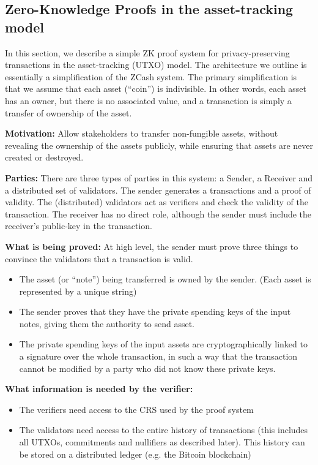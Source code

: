 \subsection{Zero-Knowledge Proofs in the asset-tracking model}

In this section, we describe a simple ZK proof system for privacy-preserving transactions in the asset-tracking (UTXO) model.  The architecture we outline is essentially a simplification of the ZCash system.  The primary simplification is that we assume that each asset (“coin”) is indivisible.  In other words, each asset has an owner, but there is no associated value, and a transaction is simply a transfer of ownership of the asset.

\textbf{Motivation:} Allow stakeholders to transfer non-fungible assets, without revealing the ownership of the assets publicly, while ensuring that assets are never created or destroyed.

\textbf{Parties:} There are three types of parties in this system: a Sender, a Receiver and a distributed set of validators.  The sender generates a transactions and a proof of validity.  The (distributed) validators act as verifiers and check the validity of the transaction.  The receiver has no direct role, although the sender must include the receiver’s public-key in the transaction.

\textbf{What is being proved:} At high level, the sender must prove three things to convince the validators that a transaction is valid.
\begin{itemize}
 \item The asset (or “note”) being transferred is owned by the sender.  (Each asset is represented by a unique string)
 \item The sender proves that they have the private spending keys of the input notes, giving them the authority to send asset.
 \item The private spending keys of the input assets are cryptographically linked to a signature over the whole transaction, in such a way that the transaction cannot be modified by a party who did not know these private keys.
\end{itemize}

\textbf{What information is needed by the verifier:}
\begin{itemize}
 \item The verifiers need access  to the CRS used by the proof system
 \item The validators need access to the entire history of transactions (this includes all UTXOs, commitments and nullifiers as described later).  This history can be stored on a distributed ledger (e.g. the Bitcoin blockchain)
\end{itemize}
		
